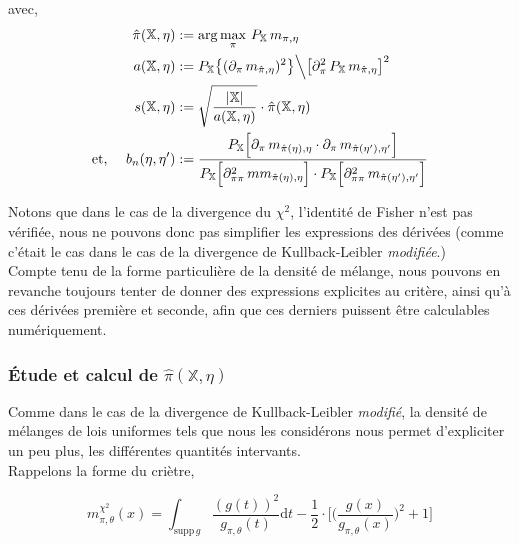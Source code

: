 \documentclass{article}
\begin{document}
    avec,
    \begin{align*}
        \hat\pi(\mathbb{X},\eta)    & := \arg\max_\pi\,P_\mathbb{X}\,m_{\pi,\eta} \\
        a(\mathbb{X,\eta})          %
                                    & := P_\mathbb{X}\big\{ (\partial_\pi\,m_{\hat\pi,\eta})^2 \big\} \Big\backslash \big[ \partial^2_\pi\,P_\mathbb{X}\,m_{\hat\pi,\eta} \big]^2 \\
        s(\mathbb{X},\eta)          & := \sqrt{\dfrac{|\mathbb{X}|}{a(\mathbb{X},\eta)}}\cdot\hat\pi(\mathbb{X},\eta) \\
        \mbox{et, }\quad b_n(\eta,\eta') & := \dfrac{ P_\mathbb{X}\Big[ \partial_\pi\,m_{\hat\pi(\eta),\eta} \cdot \partial_\pi\,m_{\hat\pi(\eta'),\eta'}\Big]}{P_\mathbb{X}\Big[ \partial^2_{\pi\pi}\,mm_{\hat\pi(\eta),\eta}\Big] \cdot P_\mathbb{X}\Big[ \partial^2_{\pi\pi}\,m_{\hat\pi(\eta'),\eta'}\Big]}
    \end{align*}
    \vspace*{0.5cm}

    Notons que dans le cas de la divergence du $\chi^2$, l'identité de Fisher n'est pas vérifiée, nous ne pouvons donc pas simplifier les expressions des dérivées (comme c'était le cas dans le cas de la divergence de Kullback-Leibler \textit{modifiée}.) \\

    Compte tenu de la forme particulière de la densité de mélange, nous pouvons en revanche toujours tenter de donner des expressions explicites au critère, ainsi qu'à ces dérivées première et seconde, afin que ces derniers puissent être calculables numériquement. \\

    \subsubsection{Étude et calcul de $\hat\pi(\mathbb{X},\eta)$}

    Comme dans le cas de la divergence de Kullback-Leibler \textit{modifié}, la densité de mélanges de lois uniformes tels que nous les considérons nous permet d'expliciter un peu plus, les différentes quantités intervants. \\

    Rappelons la forme du criètre,

    $$m_{\pi,\theta}^{\chi^2}(x) = \int_{\mathrm{supp}\,g} \dfrac{(g(t))^2}{g_{\pi,\theta}(t)}\mathrm{d}t - \dfrac{1}{2}\cdot\Big[ \Big(\dfrac{g(x)}{g_{\pi,\theta}(x)}\Big)^2 + 1 \Big]$$
    \vspace*{0.5cm}
\end{document}
